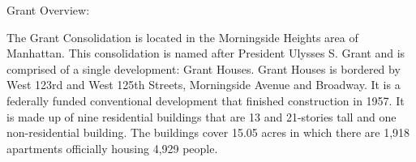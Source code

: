 Grant Overview:    

  

The Grant Consolidation is located in the Morningside Heights area of Manhattan. This consolidation is named after President Ulysses S. Grant and is comprised of a single development: Grant Houses. Grant Houses is bordered by West 123rd and West 125th Streets, Morningside Avenue and Broadway. It is a federally funded conventional development that finished construction in 1957. It is made up of nine residential buildings that are 13 and 21-stories tall and one non-residential building. The buildings cover 15.05 acres in which there are 1,918 apartments officially housing 4,929 people.